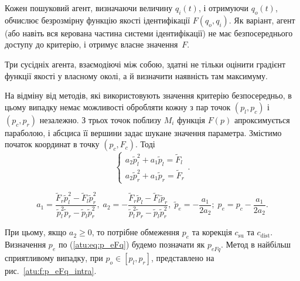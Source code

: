 \documentclass[a4paper,13pt]{atuaref}
\begin{document}
Кожен пошуковий агент, визначаючи величину $q_{i}(t)$, і отримуючи $q_o(t)$,
обчислює безрозмірну функцію якості ідентифікації $F (q_o, q_i)$. Як
варіант, агент (або навіть вся керована частина системи ідентифікації) не має
безпосереднього доступу до критерію, і отримує власне значення~$F$.

Три сусідніх агента, взаємодіючі між собою, здатні не тільки оцінити градієнт
функції якості у власному околі, а й визначити наявність там
максимуму.

На відміну від методів, які використовують значення критерію безпосередньо, в
цьому випадку немає можливості обробляти кожну з пар точок $(p_l, p_c)$ і
$(p_c, p_r)$ незалежно. З трьох точок поблизу $M_{i}$ функція $F(p)$
апроксимується параболою, і абсциса її вершини задає шукане значення параметра.
Змістимо початок координат в точку
$(p_c, F_c)$. Тоді
\[
  \left\{
    \begin{array}{l}
      a_2 \tilde{p}_l^2 + a_1 \tilde{p}_l  = \tilde{F}_l
      \\
      a_2 \tilde{p}_r^2 + a_1 \tilde{p}_r  = \tilde{F}_r
    \end{array}
  \right. .
\]
%
%

\begin{equation}
   a_1 = \frac{\tilde{F}_r \tilde{p}_l^2 - \tilde{F}_l \tilde{p}_r^2 }
              { \tilde{p}_l^2 \tilde{p}_r  - \tilde{p}_l \tilde{p}_r^2 },
  \;
  a_2 = - \frac{\tilde{F}_r \tilde{p}_l - \tilde{F}_l \tilde{p}_r }
               { \tilde{p}_l^2 \tilde{p}_r  - \tilde{p}_l \tilde{p}_r^2 },
  \;
  \tilde{p}_e = - \frac{a_1}{2 a_2};
  \;
  p_e = p_c - \frac{a_1}{2 a_2}.
  \label{atu:eq:p_eFq}
\end{equation}

При цьому, якщо
$a_2 \ge 0$,
то потрібне обмеження $p_e$ та корекція $c_\mathrm{su}$ та $c_\mathrm{dist}$.
Визначення $p_e$ по (\ref{atu:eq:p_eFq}) будемо позначати як $p_{eFq}$.
Метод в найбільш сприятливому випадку, при
$p_o \in [p_l,p_r]$, представлено на рис.~\ref{atu:f:p_eFq_intra}.
\end{document}
